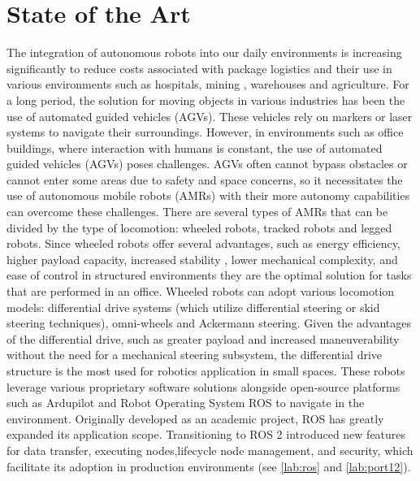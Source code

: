 \chapter{State of the Art}
The integration of autonomous robots into our daily environments is increasing significantly to reduce costs associated with package logistics\cite{5262912}\cite{PEREZGRAU2021312} and their use in various environments such as hospitals\cite{technologies9010008}\cite{10.1007/978-3-030-57993-7_76}, mining \cite{grehl2015mining}, warehouses\cite{poudel2013coordinating}\cite{keith2024reviewautonomousmobilerobots} and agriculture\cite{machines11010048}. For a long period, the solution for moving objects in various industries has been the use of automated guided vehicles (AGVs). These vehicles rely on markers or laser systems to navigate their surroundings. However, in environments such as office buildings, where interaction with humans is constant, the use of automated guided vehicles (AGVs) poses challenges. AGVs often cannot bypass obstacles or cannot enter some areas due to safety and space concerns, so it necessitates the use of autonomous mobile robots (AMRs)\cite{10797381} with their more autonomy capabilities can overcome these challenges.
There are several types of AMRs that can be divided by the type of locomotion: wheeled robots, tracked robots and legged robots. Since wheeled robots offer several advantages, such as energy efficiency, higher payload capacity\cite{tagliavini2022wheeled}, increased stability \cite{doi:10.1177/1729881419839596}, lower mechanical complexity, and ease of control in structured environments\cite{ms-3-49-2012} they are the optimal solution for tasks that are performed in an office.
Wheeled robots can adopt various locomotion models: differential drive systems (which utilize differential steering or skid steering techniques), omni-wheels and Ackermann steering. 
Given the advantages of the differential drive, such as greater payload and increased maneuverability without the need for a mechanical steering subsystem, the differential drive structure is the most used for robotics application \cite{5427035}\cite{tagliavini2022wheeled} in small spaces.
These robots leverage various proprietary software solutions alongside open-source platforms such as Ardupilot\cite{11163478} and Robot Operating System ROS\cite{quigley2009ros} to navigate in the environment. Originally developed as an academic project, ROS has greatly expanded its application scope\cite{Macenski_2022}. Transitioning to ROS 2 introduced new features for data transfer\cite{pardo2005introduction}, executing nodes\cite{macenski2023impactros2node},lifecycle node management, and security\cite{vilches2022sros2usablecybersecurity}, which facilitate its adoption in production environments (see \ref{lab:ros} and \ref{lab:port12}).\\
